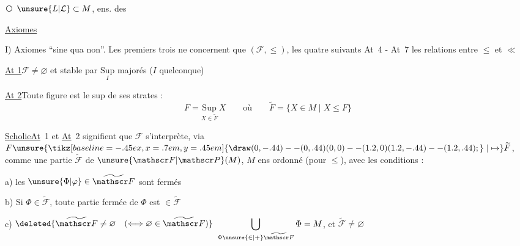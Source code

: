 \textcircled{\scriptsize{}} $\unsure{L|\mathcal L}\subset M$, ens. des   

\uline{Axiomes}

I) Axiomes ``sine qua non''. Les premiers trois  ne concernent que $(\mathscr F,\leq)$, les quatre suivants At~4 - At~7   les relations entre $\leq$ et $\ll$

\uline{At 1}\quad $\mathscr F\neq\varnothing$ et stable par $\underset{I}{\mathrm{Sup}}$ majorés ($I$ quelconque)

\uline{At 2}\quad Toute figure est le sup de ses strates :
\[
 F=\underset{X\in\widetilde F}{\mathrm{Sup}}\,X\qquad\text{où}\qquad
 \widetilde F=\{X\in M\mid X\leq F\}
\]

\uline{Scholie}\qquad \uline{At}~1 et \uline{At}~2 signifient que $\mathscr F$ s'interprète, via $F\unsure{\mathrel{\tikz[baseline=-.45ex,x=.7em,y=.45em]{\draw (0,-.44)--(0,.44) (0,0)--(1.2,0) (1.2,-.44)--(1.2,.44);}}|\mapsto}\widetilde F$, comme une partie $\widetilde{\mathscr F}$ de $\unsure{\mathscr F|\mathscr P}(M)$, $M$ ens ordonné (pour $\leq$), avec les conditions :

a) les $\unsure{\Phi|\varphi}\in\widetilde{\mathscr F}$ sont fermés

b) Si $\Phi\in\widetilde{\mathscr F}$, toute partie fermée de $\Phi$ est $\in\widetilde{\mathscr F}$

c) $\deleted{\widetilde{\mathscr F}\neq\varnothing\quad(\Longleftrightarrow\varnothing\in\widetilde{\mathscr F})}$  $\displaystyle\bigcup_{\Phi\unsure{\in|+}\widetilde{\mathscr F}}\Phi=M$, et $\widetilde{\mathscr F}\neq\varnothing$

